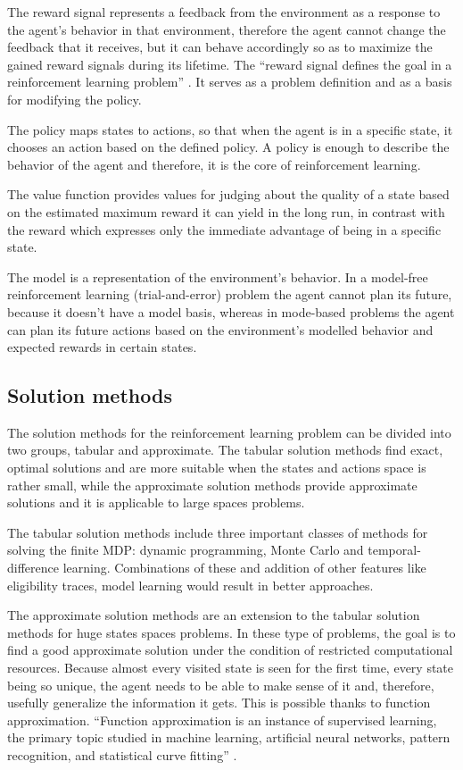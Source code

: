 The reward signal represents a feedback from the environment as a response to the agent’s behavior in that environment, therefore the agent cannot change the feedback that it receives, but it can behave accordingly so as to maximize the gained reward signals during its lifetime. The “reward signal defines the goal in a reinforcement learning problem” \cite{Sutton}. It serves as a problem definition and as a basis for modifying the policy.

The policy maps states to actions, so that when the agent is in a specific state, it chooses an action based on the defined policy. A policy is enough to describe the behavior of the agent and therefore, it is the core of reinforcement learning.

The value function provides values for judging about the quality of a state based on the estimated maximum reward it can yield in the long run, in contrast with the reward which expresses only the immediate advantage of being in a specific state.

The model is a representation of the environment’s behavior. In a model-free reinforcement learning (trial-and-error) problem the agent cannot plan its future, because it doesn’t have a model basis, whereas in mode-based problems the agent can plan its future actions based on the environment’s modelled behavior and expected rewards in certain states.
\subsection{Solution methods}
The solution methods for the reinforcement learning problem can be divided into two groups, tabular and approximate. The tabular solution methods find exact, optimal solutions and are more suitable when the states and actions space is rather small, while the approximate solution methods provide approximate solutions and it is applicable to large spaces problems.

The tabular solution methods include three important classes of methods for solving the finite MDP: dynamic programming, Monte Carlo and temporal-difference learning. Combinations of these and addition of other features like eligibility traces, model learning would result in better approaches.

The approximate solution methods are an extension to the tabular solution methods for huge states spaces problems. In these type of problems, the goal is to find a good approximate solution under the condition of restricted computational resources. Because almost every visited state is seen for the first time, every state being so unique, the agent needs to be able to make sense of it and, therefore, usefully generalize the information it gets. This is possible thanks to function approximation. “Function approximation is an instance of supervised learning, the primary topic studied in machine learning, artificial neural networks, pattern recognition, and statistical curve fitting” \cite{Sutton}.
